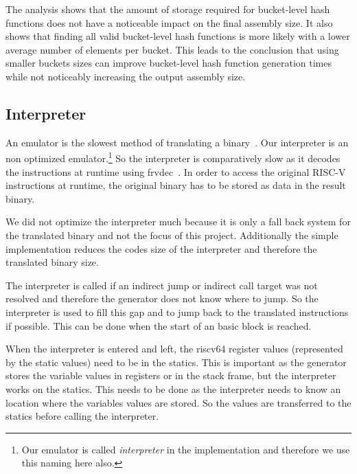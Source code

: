 \documentclass[course=eragp]{aspdoc}
\begin{document}
\par

The analysis shows that
the amount of storage required for bucket-level hash functions does not have a noticeable impact on
the final assembly size. It also shows that finding all valid bucket-level hash functions is more
likely with a lower average number of elements per bucket. This leads to the conclusion that using
smaller buckets sizes can improve bucket-level hash function generation times while not noticeably
increasing the output assembly size.

\subsection{Interpreter}\label{interpreter}

An emulator is the slowest method of translating a binary~\cite{binary_translation}. Our interpreter
is an non optimized emulator.\footnote{Our emulator is called \textit{interpreter} in the implementation
    and therefore we use this naming here also.} So the interpreter is comparatively slow as it decodes the
instructions at runtime using frvdec~\cite{frvdec}. In order to access the original RISC-V
instructions at runtime, the original binary has to be stored as data in the result binary.

\par

We did not optimize the interpreter much because it is only a fall back system for the translated
binary and not the focus of this project. Additionally the simple implementation reduces the codes
size of the interpreter and therefore the translated binary size.

\par

The interpreter is called if an indirect jump or indirect call target was not resolved and therefore
the generator does not know where to jump. So the interpreter is used to fill this gap and to jump
back to the translated instructions if possible. This can be done when the start of an basic block
is reached.

\par

When the interpreter is entered and left, the riscv64 register values (represented by the static
values) need to be in the statics. This is important as the generator stores the variable values in
registers or in the stack frame, but the interpreter works on the statics. This needs to be done as
the interpreter needs to know an location where the variables values are stored. So the values are
transferred to the statics before calling the interpreter.
\end{document}
